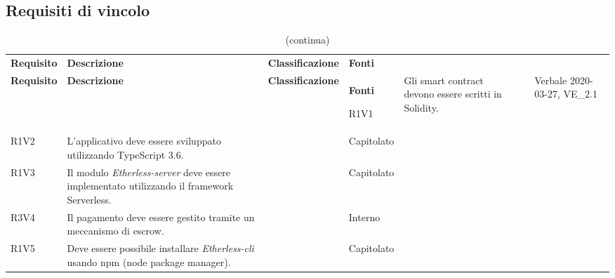 \subsection{Requisiti di vincolo}

\def\arraystretch{1.75}
\begin{longtable}{ 
		>{\centering}p{} 
		>{}p{} 
		>{\centering}p{}
		>{\centering}p{} }
	
	\caption{Tabella dei requisiti di vincolo} \\ 
	\coloredTableHead
	\textbf{\color{white}Requisito} & 
	\centering\textbf{\color{white}Descrizione} & 
	\centering\textbf{\color{white}Classificazione} &
	\textbf{\color{white}Fonti} 
	\endfirsthead
	
	\caption[]{(continua)}\\
	\textbf{\color{white}Requisito} &
	\centering\textbf{\color{white}Descrizione} &
	\centering\textbf{\color{white}Classificazione} &
	\textbf{\color{white}Fonti} 
	\endhead
	
	R1V1 & Gli smart contract devono essere scritti in 
	Solidity.												& \ob & Verbale 2020-03-27, VE\_2.1\tabularnewline
	R1V2 & L'applicativo deve essere sviluppato utilizzando 
		TypeScript 3.6.										& \ob & Capitolato \tabularnewline
	R1V3 & Il modulo \textit{Etherless-server} deve essere implementato 
			utilizzando il framework Serverless.
												 							& \ob & Capitolato \tabularnewline
	R3V4 & Il pagamento deve essere gestito tramite un meccanismo di escrow.	& \op & Interno \tabularnewline
	R1V5 & Deve essere possibile installare \textit{Etherless-cli} 
		usando npm (node package manager).						& \ob & Capitolato \tabularnewline
	
	
\end{longtable}
